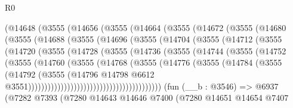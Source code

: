 \begin{lexlean}{R0}
\begin{coremodule}
        (@14648
          (@3555
            (@14656
              (@3555
                (@14664
                  (@3555
                    (@14672
                      (@3555
                        (@14680
                          (@3555
                            (@14688
                              (@3555
                                (@14696
                                  (@3555
                                    (@14704
                                      (@3555
                                        (@14712
                                          (@3555
                                            (@14720
                                              (@3555
                                                (@14728
                                                  (@3555
                                                    (@14736
                                                      (@3555
                                                        (@14744
                                                          (@3555
                                                            (@14752
                                                              (@3555
                                                                (@14760
                                                                  (@3555
                                                                    (@14768
                                                                      (@3555
                                                                        (@14776
                                                                          (@3555
                                                                            (@14784
                                                                              (@3555
                                                                                (@14792
                                                                                  (@3555
                                                                                    (@14796
                                                                                      @14798
                                                                                      @6612
                                                                                      @3551)))))))))))))))))))))))))))))))))))))))))
    (fun (__b : @3546) =>
    @6937
      (@7282
        @7393
        (@7280
          @14643
          @14646
          @7400
          (@7280
            @14651
            @14654
            @7407

\end{coremodule}
\end{lexlean}

